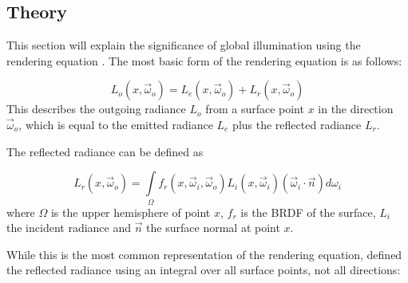 \subsection{Theory}
\label{sec:intro:gi:theory}


\newcommand{\dir}{\vec\omega} %

\newcommand{\outgoingDir}{ \dir_o}
\newcommand{\incidenceDir}{\dir_i}

\newcommand{\outgoingRadiance}{  L_o(x, \outgoingDir)}
\newcommand{\emittedRadiance}{   L_e(x, \outgoingDir)}
\newcommand{\reflectedRadiance}{ L_r(x, \outgoingDir)}
\newcommand{\incidentRadiance}{  L_i(x, \incidenceDir)}

\newcommand{\brdf}{f_r} %

\newcommand{\surfaceNormal}{\vec{n}}

This section will explain the significance of global illumination using the rendering equation \citep{Kajiya:1986:RenderingEquation}. The most basic form of the rendering equation is as follows:

  \begin{equation}
    \outgoingRadiance = \emittedRadiance + \reflectedRadiance
  \label{eq:renderBasic}
  \end{equation}
\noindent
This describes the outgoing radiance $L_o$ from a surface point $x$ in the direction $\outgoingDir$, which is equal to the emitted radiance $L_e$ plus the reflected radiance $L_r$.

The reflected radiance can be defined as

  \begin{equation}
    \reflectedRadiance = \int\limits_{\Omega} \brdf(x, \incidenceDir, \outgoingDir)\incidentRadiance (\incidenceDir \cdot \surfaceNormal) d \omega_i
  \label{eq:render}
  \end{equation}
\noindent
where $\Omega$ is the upper hemisphere of point $x$, $\brdf$ is the BRDF of the surface, $L_i$ the incident radiance and $\surfaceNormal$ the surface normal at point $x$.

While this is the most common representation of the rendering equation, \citet{Kajiya:1986:RenderingEquation} defined the reflected radiance using an integral over all surface points, not all directions:

